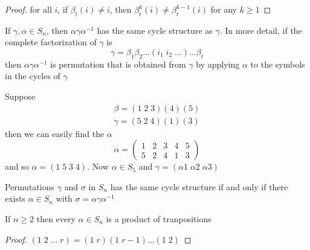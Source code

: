 \documentclass[11pt]{article}
\begin{document}
\begin{proof}
for all \(i\), if \(\beta_t(i)\neq i\), then \(\beta_t^k(i)\neq\beta_t^{k-1}(i)\)
for any \(k\ge 1\)
\end{proof}

\begin{lemma}[]
If \(\gamma,\alpha\in S_n\), then \(\alpha\gamma\alpha^{-1}\) has the same cycle
structure as \(\gamma\). In more detail, if the complete factorization of
\(\gamma\) is
\begin{equation*}
\gamma=\beta_1\beta_2\dots(i_1\; i_2\;\dots)\dots\beta_t
\end{equation*}
then \(\alpha\gamma\alpha^{-1}\) is permutation that is obtained from \(\gamma\)
by applying \(\alpha\) to the symbols in the cycles of \(\gamma\)
\end{lemma}

\begin{examplle}[]
\label{example2.8}
Suppose
\begin{gather*}
\beta=(1\;2\;3)(4)(5)\\
\gamma=(5\;2\;4)(1)(3)
\end{gather*}
then we can easily find the \(\alpha\)
\begin{equation*}
\alpha=
\begin{pmatrix}
1&2&3&4&5\\
5&2&4&1&3
\end{pmatrix}
\end{equation*}
and so \(\alpha=(1\;5\;3\;4)\). Now \(\alpha\in S_5\) and \(\gamma=(\alpha 1\;\alpha
   2\;\alpha 3)\)
\end{examplle}
\begin{theorem}[]
Permutations \(\gamma\) and \(\sigma\) in \(S_n\) has the same cycle structure if
and only if there exists \(\alpha\in S_n\) with \(\sigma=\alpha\gamma\alpha^{-1}\)
\end{theorem}


\begin{proposition}[]
If \(n\ge 2\) then every \(\alpha\in S_n\) is a product of tranpositions
\end{proposition}
\begin{proof}
\((1\;2\;\dots\; r)=(1\; r)(1\; r-1)\dots(1\; 2)\)
\end{proof}
\end{document}
